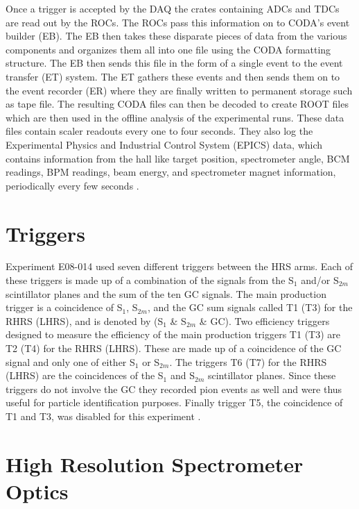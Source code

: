 Once a trigger is accepted by the DAQ the crates containing ADCs and TDCs are read out by the ROCs. The ROCs pass this information on to CODA's event builder (EB). The EB then takes these disparate pieces of data from the various components and organizes them all into one file using the CODA formatting structure. The EB then sends this file in the form of a single event to the event transfer (ET) system. The ET gathers these events and then sends them on to the event recorder (ER) where they are finally written to permanent storage such as tape file. The resulting CODA files can then be decoded to create ROOT files which are then used in the offline analysis of the experimental runs. These data files contain scaler readouts every one to four seconds. They also log the Experimental Physics and Industrial Control System (EPICS) data, which contains information from the hall like target position, spectrometer angle, BCM readings, BPM readings, beam energy, and spectrometer magnet information, periodically every few seconds \cite{Thesis:Ye} \cite{DAQ}. 

\section{Triggers}
\label{sec:triggers}

Experiment E08-014 used seven different triggers between the HRS arms. Each of these triggers is made up of a combination of the signals from the S$_1$ and/or S$_{2m}$ scintillator planes and the sum of the ten GC signals. The main production trigger is a coincidence of S$_1$, S$_{2m}$, and the GC sum signals called T1 (T3) for the RHRS (LHRS), and is denoted by (S$_1$ \& S$_{2m}$ \& GC). Two efficiency triggers designed to measure the efficiency of the main production triggers T1 (T3) are T2 (T4) for the RHRS (LHRS). These are made up of a coincidence of the GC signal and only one of either S$_1$ or S$_{2m}$. The triggers T6 (T7) for the RHRS (LHRS) are the coincidences of the S$_1$ and S$_{2m}$ scintillator planes. Since these triggers do not involve the GC they recorded pion events as well and were thus useful for particle identification purposes. Finally trigger T5, the coincidence of T1 and T3, was disabled for this experiment \cite{Thesis:Ye}. 

\section{High Resolution Spectrometer Optics}
\label{sec:optics}

